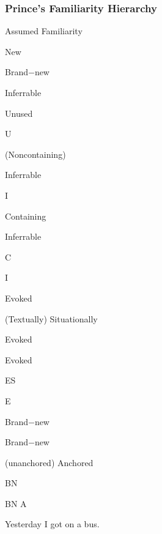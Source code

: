 \documentclass[compress,color=usenames]{beamer}
\begin{document}
\begin{frame}
\frametitle{
Prince's Familiarity Hierarchy}



Assumed Familiarity






New






Brand$-$new






Inferrable






Unused



U






(Noncontaining)



Inferrable



I






Containing



Inferrable



C



I






Evoked






(Textually) Situationally



Evoked



Evoked



ES



E






Brand$-$new



Brand$-$new



(unanchored) Anchored



BN



BN A






Yesterday I got on a bus.










\end{frame}
\end{document}
